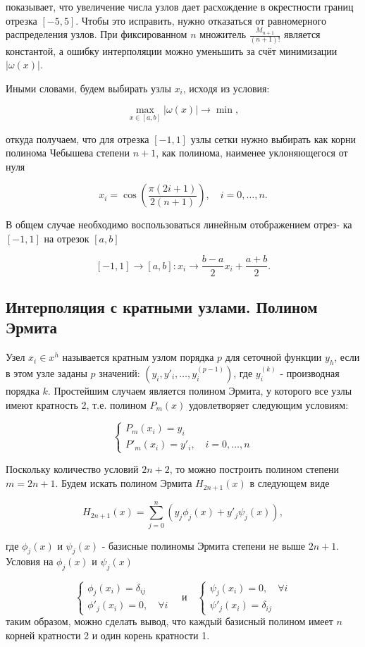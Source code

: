 показывает, что увеличение числа узлов дает расхождение в окрестности границ отрезка \([-5, 5]\). Чтобы это исправить, нужно отказаться от равномерного распределения узлов. При фиксированном \(n\) множитель \(\frac{M_{n+1}}{(n+1)!}\) является константой, а ошибку интерполяции можно уменьшить за счёт минимизации \(|\omega(x)|\). 

Иными словами, будем выбирать узлы \(x_i\), исходя из условия:

$$\max_{x \in [a, b]} |\omega(x)| \to \min,$$

откуда получаем, что для отрезка \([-1, 1]\) узлы сетки нужно выбирать  
как корни полинома Чебышева степени \(n + 1\), как полинома,  
наименее уклоняющегося от нуля  

$$x_i = \cos \left( \frac{\pi (2i + 1)}{2(n + 1)} \right), \quad i = 0, \dots, n.$$

В общем случае необходимо воспользоваться линейным отображением отрез-  
ка \([-1, 1]\) на отрезок \([a, b]\)  

$$[-1, 1] \to [a, b] : x_i \to \frac{b - a}{2} x_i + \frac{a + b}{2}.$$

\subsection{Интерполяция с кратными узлами. Полином Эрмита}

Узел \( x_i \in x^h \) называется кратным узлом порядка \( p \) для сеточной функции \( y_h \), если в этом узле заданы \( p \) значений: \( (y_i, y'_i, \dots, y^{(p-1)}_i) \), где \( y^{(k)}_i \) - производная порядка \( k \). Простейшим случаем является полином Эрмита, у которого все узлы имеют кратность 2, т.е. полином \( P_m(x) \) удовлетворяет следующим условиям:

$$\begin{cases} 
	P_m(x_i) = y_i \\ 
	P'_m(x_i) = y'_i, \quad i = 0, \dots, n 
\end{cases}$$

Поскольку количество условий \( 2n + 2 \), то можно построить полином степени \( m = 2n + 1 \). Будем искать полином Эрмита \( H_{2n+1}(x) \) в следующем виде

$$H_{2n+1}(x) = \sum_{j=0}^n (y_j \phi_j(x) + y'_j \psi_j(x)),$$

где \( \phi_j(x) \) и \( \psi_j(x) \) - базисные полиномы Эрмита степени не выше \( 2n + 1 \). Условия на \( \phi_j(x) \) и \( \psi_j(x) \)

$$\begin{cases} 
	\phi_j(x_i) = \delta_{ij} \\ 
	\phi'_j(x_i) = 0, \quad \forall i 
\end{cases}
\quad \text{и} \quad \begin{cases} 
	\psi_j(x_i) = 0, \quad \forall i \\ 
	\psi'_j(x_i) = \delta_{ij} 
\end{cases}
$$
таким образом, можно сделать вывод, что каждый базисный полином имеет \( n \) корней кратности 2 и один корень кратности 1.

